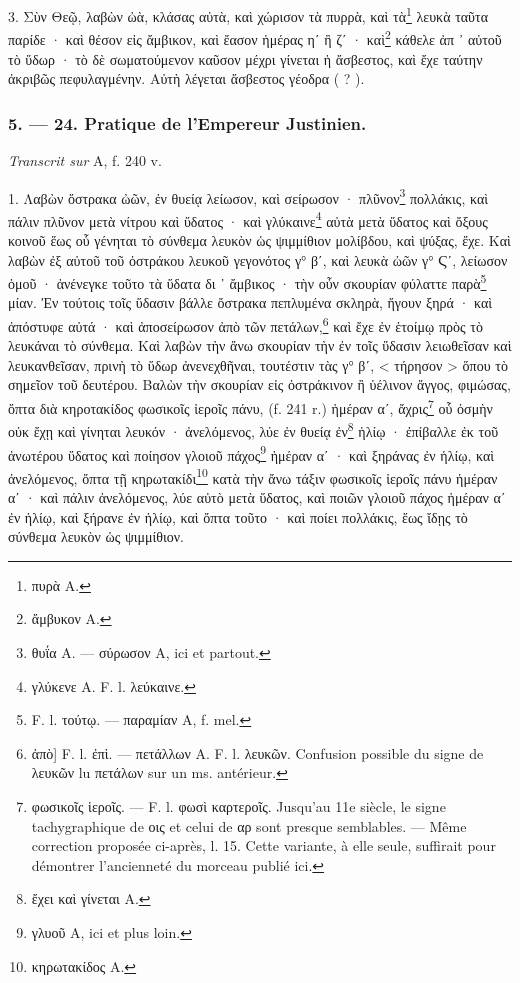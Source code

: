\documentclass[a4paper, 11pt, oneside, polutonikogreek, french]{article}
\begin{document}
3. Σὺν Θεῷ, λαβὼν ὠὰ, κλάσας αὐτὰ, καὶ χώρισον τὰ πυρρὰ, καὶ τὰ\footnote{πυρὰ A.} λευκὰ ταῦτα παρίδε · καὶ θέσον εἰς ἄμβικον, καὶ ἔασον ἡμέρας ηʹ ἢ ζʹ · καὶ\footnote{ἄμβυκον A.} κάθελε ἀπ ᾽ αὐτοῦ τὸ ὕδωρ · τὸ δὲ σωματούμενον καῦσον μέχρι γίνεται ἡ ἄσβεστος, καὶ ἔχε ταύτην ἀκριβῶς πεφυλαγμένην. Αὐτὴ λέγεται ἄσβεστος γέοδρα ( ? ).

\bigskip
\centerline{\EightStarTaper}
\centerline{\EightStarTaper\EightStarTaper}
\bigskip

\subsubsection{5. --- 24. Pratique de l'Empereur Justinien.}

\emph{Transcrit sur} A, f. 240 v.

1. Λαβὼν ὄστρακα ὠῶν, ἐν θυείᾳ λείωσον, καὶ σείρωσον · πλῦνον\footnote{θυΐα A. --- σύρωσον A, ici et partout.} πολλάκις, καὶ πάλιν πλῦνον μετὰ νίτρου καὶ ὕδατος · καὶ γλύκαινε\footnote{γλύκενε A. F. l. λεύκαινε.} αὐτὰ μετὰ ὕδατος καὶ ὄξους κοινοῦ ἕως οὗ γένηται τὸ σύνθεμα λευκὸν ὡς ψιμμίθιον μολίβδου, καὶ ψύξας, ἔχε. Καὶ λαβὼν ἐξ αὐτοῦ τοῦ ὀστράκου λευκοῦ γεγονότος γ° βʹ, καὶ λευκὰ ὠῶν γ° Ϛʹ, λείωσον ὁμοῦ · ἀνένεγκε τοῦτο τὰ ὕδατα δι ᾽ ἄμβικος · τὴν οὖν σκουρίαν φύλαττε παρὰ\footnote{F. l. τούτῳ. --- παραμίαν A, f. mel.} μίαν. Ἐν τούτοις τοῖς ὕδασιν βάλλε ὄστρακα πεπλυμένα σκληρὰ, ἤγουν ξηρά · καὶ ἀπόστυφε αὐτά · καὶ ἀποσείρωσον ἀπὸ τῶν πετάλων,\footnote{ἀπὸ] F. l. ἐπὶ. --- πετάλλων A. F. l. λευκῶν. Confusion possible du signe de λευκῶν lu πετάλων sur un ms. antérieur.} καὶ ἔχε ἐν ἑτοίμῳ πρὸς τὸ λευκάναι τὸ σύνθεμα. Καὶ λαβὼν τὴν ἄνω σκουρίαν τὴν ἐν τοῖς ὕδασιν λειωθεῖσαν καὶ λευκανθεῖσαν, πρινὴ τὸ ὕδωρ ἀνενεχθῆναι, τουτέστιν τὰς γ° βʹ, < τήρησον > ὅπου τὸ σημεῖον τοῦ δευτέρου. Βαλὼν τὴν σκουρίαν εἰς ὀστράκινον ἢ ὑέλινον ἄγγος, φιμώσας, ὄπτα διὰ κηροτακίδος φωσικοῖς ἱεροῖς πάνυ, (f. 241 r.) ἡμέραν αʹ, ἄχρις\footnote{φωσικοῖς ἱεροῖς. --- F. l. φωσὶ καρτεροῖς. Jusqu'au 11e siècle, le signe tachygraphique de οις et celui de αρ sont presque semblables. --- Même correction proposée ci-après, l. 15. Cette variante, à elle seule, suffirait pour démontrer l'ancienneté du morceau publié ici.} οὗ ὀσμὴν οὐκ ἔχῃ καὶ γίνηται λευκόν · ἀνελόμενος, λύε ἐν θυείᾳ ἐν\footnote{ἔχει καὶ γίνεται A.} ἡλίῳ · ἐπίβαλλε ἐκ τοῦ ἀνωτέρου ὕδατος καὶ ποίησον γλοιοῦ πάχος\footnote{γλυοῦ A, ici et plus loin.} ἡμέραν αʹ · καὶ ξηράνας ἐν ἡλίῳ, καὶ ἀνελόμενος, ὄπτα τῇ κηρωτακίδι\footnote{κηρωτακίδος A.} κατὰ τὴν ἄνω τάξιν φωσικοῖς ἱεροῖς πάνυ ἡμέραν αʹ · καὶ πάλιν ἀνελόμενος, λύε αὐτὸ μετὰ ὕδατος, καὶ ποιῶν γλοιοῦ πάχος ἡμέραν αʹ ἐν ἡλίῳ, καὶ ξήρανε ἐν ἡλίῳ, καὶ ὄπτα τοῦτο · καὶ ποίει πολλάκις, ἕως ἴδῃς τὸ σύνθεμα λευκὸν ὡς ψιμμίθιον.
\end{document}
